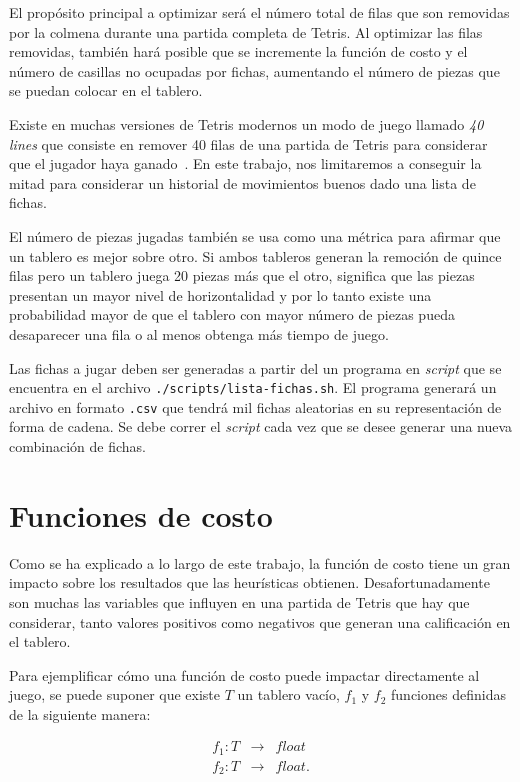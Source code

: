 El propósito principal a optimizar será el número total de filas que son removidas 
por la colmena durante una partida completa de Tetris. Al optimizar las filas 
removidas, también hará posible que se incremente la función de costo y el número 
de casillas no ocupadas por fichas, aumentando el número de piezas que se puedan 
colocar en el tablero.

Existe en muchas versiones de Tetris modernos un modo de juego llamado 
\textit{40 lines} que consiste en remover 40 filas de una partida de Tetris 
para considerar que el jugador haya ganado~\cite{line-tetris}. En este trabajo, nos 
limitaremos a conseguir la mitad para considerar un historial de movimientos 
buenos dado una lista de fichas.

El número de piezas jugadas también se usa como una métrica para afirmar 
que un tablero es mejor sobre otro. Si ambos tableros generan la remoción 
de quince filas pero un tablero juega 20 piezas más que el otro, significa 
que las piezas presentan un mayor nivel de horizontalidad y por lo tanto existe 
una probabilidad mayor de que el tablero con mayor número de piezas pueda 
desaparecer una fila o al menos obtenga más tiempo de juego.

Las fichas a jugar deben ser generadas a partir del un programa en \emph{script}
que se encuentra en el archivo \texttt{./scripts/lista-fichas.sh}. El programa
generará un archivo en formato \texttt{.csv} que tendrá mil fichas aleatorias en
su representación de forma de cadena. Se debe correr el \emph{script} cada vez que se
desee generar una nueva combinación de fichas.

\section{Funciones de costo}

Como se ha explicado a lo largo de este trabajo, la función de costo tiene un 
gran impacto sobre los resultados que las heurísticas obtienen. Desafortunadamente 
son muchas las variables que influyen en una partida de Tetris que hay que 
considerar, tanto valores positivos como negativos que generan una calificación 
en el tablero. 

Para ejemplificar cómo una función de costo puede impactar directamente al juego, 
se puede suponer que existe $T$ un tablero vacío, $f_{1}$ y $f_{2}$ funciones definidas 
de la siguiente manera:

\begin{displaymath}
  \begin{array}{rcl}
    f_{1}: T & \rightarrow & float \\
    f_{2}: T & \rightarrow & float.
  \end{array}
\end{displaymath}


